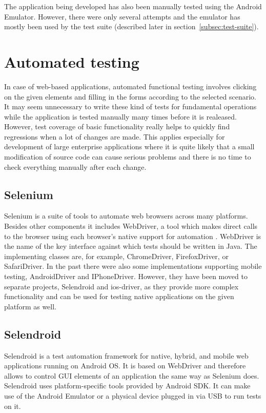 \documentclass[12pt,oneside,final]{fithesis2}
\begin{document}
The application being developed has also been manually tested using the Android Emulator.
However, there were only several attempts and the emulator has mostly been used by the test suite (described later in section~\ref{subsec:test-suite}).

\section{Automated testing}
In case of web-based applications, automated functional testing involves clicking on the given elements and filling in the forms according to the selected scenario.
It may seem unnecessary to write these kind of tests for fundamental operations while the application is tested manually many times before it is realeased.
However, test coverage of basic functionality really helps to quickly find regressions when a lot of changes are made.
This applies especially for development of large enterprise applications where it is quite likely that a small modification of source code can cause serious problems and there is no time to check everything manually after each change.

\subsection{Selenium}
Selenium is a suite of tools to automate web browsers across many platforms.
Besides other components it includes WebDriver, a tool which makes direct calls to the browser using each browser’s native support for automation \cite{webdriver}.
WebDriver is the name of the key interface against which tests should be written in Java.
The implementing classes are, for example, ChromeDriver, FirefoxDriver, or SafariDriver.
In the past there were also some implementations supporting mobile testing, AndroidDriver and IPhoneDriver.
However, they have been moved to separate projects, Selendroid\footnotemark{} and ios-driver\footnotemark{}, as they provide more complex functionality and can be used for testing native applications on the given platform as well.

\subsection{Selendroid}
Selendroid is a test automation framework for native, hybrid, and mobile web applications running on Android OS.
It is based on WebDriver and therefore allows to control GUI elements of an application the same way as Selenium does.
Selendroid uses platform-specific tools provided by Android SDK.
It can make use of the Android Emulator or a physical device plugged in via USB to run tests on it.
\end{document}
